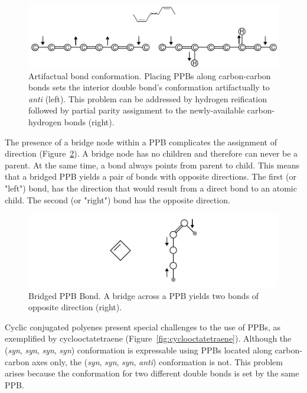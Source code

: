 \documentclass{article}
\begin{document}
\begin{figure}
    \centering
    \includegraphics[width=\columnwidth]{artifactual-bond-conformation.pdf}
    \caption{Artifactual bond conformation. Placing PPBs along carbon-carbon bonds sets the interior double bond's conformation artifactually to \textit{anti} (left). This problem can be addressed by hydrogen reification followed by partial parity assignment to the newly-available carbon-hydrogen bonds (right).}
    \label{fig:artifactual-bond-conformation}
\end{figure}

The presence of a bridge node within a PPB complicates the assignment of direction (Figure~\ref{fig:bridged-ppb-bond}). A bridge node has no children and therefore can never be a parent. At the same time, a bond always points from parent to child. This means that a bridged PPB yields a pair of bonds with opposite directions. The first (or "left") bond, has the direction that would result from a direct bond to an atomic child. The second (or "right") bond has the opposite direction.

\begin{figure}
    \centering
    \includegraphics[width=\columnwidth]{bridged-ppb-bond.pdf}
    \caption{Bridged PPB Bond. A bridge across a PPB yields two bonds of opposite direction (right).}
    \label{fig:bridged-ppb-bond}
\end{figure}

Cyclic conjugated polyenes present special challenges to the use of PPBs, as exemplified by cyclooctatetraene (Figure~\ref{fig:cyclooctatetraene}). Although the (\textit{syn}, \textit{syn}, \textit{syn}, \textit{syn}) conformation is expressable using PPBs located along carbon-carbon axes only, the (\textit{syn}, \textit{syn}, \textit{syn}, \textit{anti}) conformation is not. This problem arises because the conformation for two different double bonds is set by the same PPB.
\end{document}
